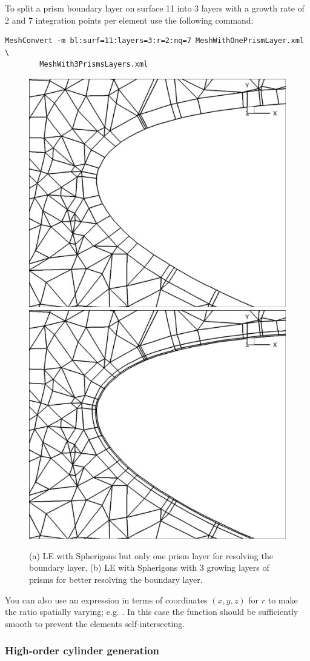 To split a prism boundary layer on surface 11 into 3 layers with a growth rate
of 2 and 7 integration points per element use the following command:
\begin{lstlisting}[style=BashInputStyle]
  MeshConvert -m bl:surf=11:layers=3:r=2:nq=7 MeshWithOnePrismLayer.xml \
        MeshWith3PrismsLayers.xml
\end{lstlisting}
%
\begin{figure}[!htbp]
  \begin{center}
    \includegraphics[width = 0.47 \textwidth]{Figures/SphnoBL.jpg}
    \includegraphics[width = 0.47 \textwidth]{Figures/SphBL.jpg}
    \caption{(a) LE with Spherigons but only one prism layer for resolving the
      boundary layer, (b) LE with Spherigons with 3 growing layers of prisms for
      better resolving the boundary layer.}
  \end{center}
\end{figure}

\begin{notebox}
  You can also use an expression in terms of coordinates $(x,y,z)$ for $r$ to
  make the ratio spatially varying; e.g. \inltt{r=sin(x)}. In this case the
  function should be sufficiently smooth to prevent the elements
  self-intersecting.
\end{notebox}

\subsubsection{High-order cylinder generation}

